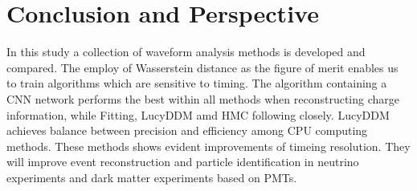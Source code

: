 \section{Conclusion and Perspective} %
\label{sec:conclusion}

In this study a collection of waveform analysis methods is developed and compared. The employ of Wasserstein distance as the figure of merit enables us to train algorithms which are sensitive to timing. The algorithm containing a CNN network performs the best within all methods when reconstructing charge information, while Fitting, LucyDDM amd HMC following closely. LucyDDM achieves balance between precision and efficiency among CPU computing methods. These methods shows evident improvements of timeing resolution. They will improve event reconstruction and particle identification in neutrino experiments and dark matter experiments based on PMTs. 

